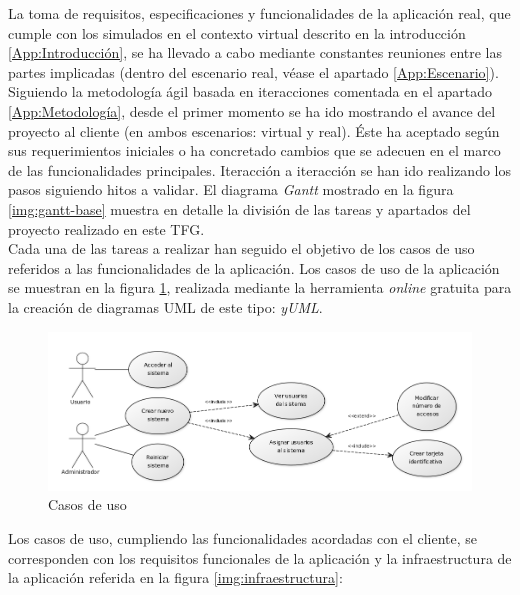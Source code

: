 \documentclass[../PFC.tex]{subfiles}
\begin{document}
La toma de requisitos, especificaciones y funcionalidades de la aplicación real, que cumple con los simulados en el contexto virtual descrito en la introducción \ref{App:Introducción}, se ha llevado a cabo mediante constantes reuniones entre las partes implicadas (dentro del escenario real, véase el apartado \ref{App:Escenario}). 
\*
\vspace{0.5515cm}
\\
Siguiendo la metodología ágil basada en iteracciones comentada en el apartado \ref{App:Metodología}, desde el primer momento se ha ido mostrando el avance del proyecto al cliente (en ambos escenarios: virtual y real). Éste ha aceptado según sus requerimientos iniciales o ha concretado cambios que se adecuen en el marco de las funcionalidades principales.  Iteracción a iteracción se han ido realizando los pasos siguiendo hitos a validar. El diagrama \textit{Gantt} mostrado en la figura \ref{img:gantt-base} muestra en detalle la división de las tareas y apartados del proyecto realizado en este TFG.
\*
\vspace{0.5515cm}
\\
Cada una de las tareas a realizar han seguido el objetivo de los casos de uso referidos a las funcionalidades de la aplicación. Los casos de uso de la aplicación se muestran en la figura \ref{img:usecase1}, realizada mediante la herramienta \textit{online} gratuita para la creación de diagramas UML de este tipo: \textit{yUML}\cite{yUML}.

\begin{figure}[H]
  \centering
  \includegraphics[width=1\textwidth]{./img/usecase1}
  \caption{Casos de uso}
  \label{img:usecase1}
\end{figure}

Los casos de uso, cumpliendo las funcionalidades acordadas con el cliente, se corresponden con los requisitos funcionales de la aplicación y la infraestructura de la aplicación referida en la figura \ref{img:infraestructura}:
\end{document}
